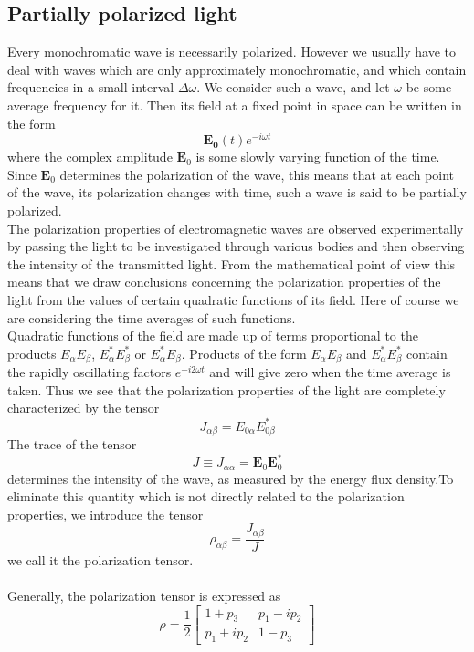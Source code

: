 \subsection{Partially polarized light}
Every monochromatic wave is necessarily polarized. However we usually have to deal with waves which are only approximately monochromatic, and which contain frequencies in a small interval $\Delta \omega$. We consider such a wave, and let $\omega$ be some average frequency for it. Then its field at a fixed point in space can be written in the form
\[\bm{E_0}(t)e^{-i\omega t}\]
where the complex amplitude $\bm{E}_0$ is some slowly varying function of the time. Since $\bm{E}_0$ determines the polarization of the wave, this means that at each point of the wave, its polarization changes with time, such a wave is said to be partially polarized.\\
The polarization properties of electromagnetic waves are observed experimentally by passing the light to be investigated through various bodies and then
observing the intensity of the transmitted light. From the mathematical point of view this means that we draw conclusions concerning the polarization properties of the light from the values of certain quadratic functions of its field. Here of course we are considering the time averages of such functions.\\
Quadratic functions of the field are made up of terms proportional to the products $E_{\alpha} E_{\beta}$,
$E_{\alpha}^{*} E^{*}_{\beta}$ or $E_{\alpha}^* E_{\beta}$. Products of the form $E_{\alpha} E_{\beta}$ and
$E_{\alpha}^{*} E^{*}_{\beta}$ contain the rapidly oscillating factors $e^{-i2\omega t}$ and will give zero when the time average is taken. Thus we see that the polarization properties of the light are completely characterized by the tensor
\[J_{\alpha \beta} = E_{0\alpha} E_{0\beta}^{*}\]
The trace of the tensor
\[J \equiv J_{\alpha\alpha} = \bm{E}_0 \bm{E}^*_0\]
determines the intensity of the wave, as measured by the energy flux density.To eliminate this quantity which is not directly related to the polarization properties, we
introduce the tensor
\[\rho_{\alpha\beta} = \frac{J_{\alpha\beta}}{J}\]
we call it the polarization tensor.\\ \\
Generally, the polarization tensor is expressed as
\[\rho = \frac{1}{2} \left[ \begin{matrix} 1+p_{3}& p_1-ip_2\\ p_1+ip_2& 1-p_{3}\end{matrix} \right] \]
